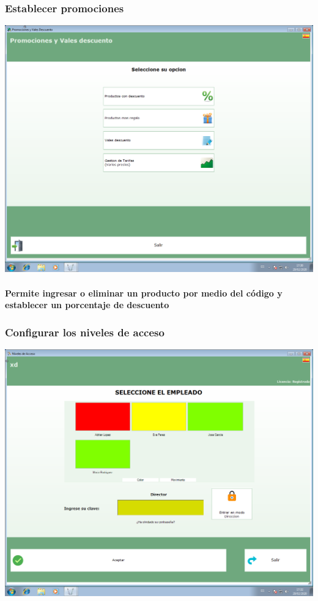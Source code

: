 \documentclass[12pt,a4paper]{ articule }
\begin{document}
\subsubsection*{Establecer promociones}
\includegraphics[scale=0.35]{Promociones.png} 
\paragraph{Permite ingresar o eliminar un producto por medio del código y establecer un porcentaje de descuento}

\subsubsection*{Configurar los niveles de acceso}
\includegraphics[scale=0.35]{Niveles de acceso.png}
\end{document}
